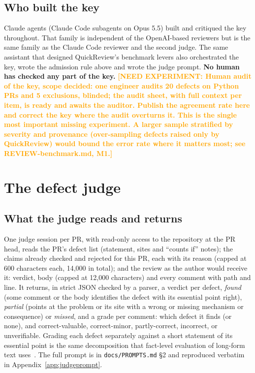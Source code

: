 \documentclass[11pt,a4paper]{article}
\newcommand{\NEEDEXP}[1]{\textcolor{orange}{\textbf{[NEED EXPERIMENT: #1]}}}
\newcommand{\qcr}{QuickReview}
\newcommand{\code}[1]{\texttt{#1}}
\begin{document}
\subsection{Who built the key}

Claude agents (Claude Code subagents on Opus 5.5) built and critiqued the
key throughout. That family is independent of the OpenAI-based reviewers but
is the same family as the Claude Code reviewer and the second judge. The
same assistant that designed \qcr{}'s benchmark levers also orchestrated
the key, wrote the admission rule above and wrote the judge prompt.
\textbf{No human has checked any part of the key.}
\NEEDEXP{Human audit of the key, scope decided: one engineer audits 20 defects
on Python PRs and 5 exclusions, blinded; the audit sheet, with full context
per item, is ready and awaits the auditor. Publish the agreement rate here and
correct the key where the audit overturns it. This is the single most
important missing experiment. A larger sample stratified by severity and
provenance (over-sampling defects raised only by \qcr{}) would bound the
error rate where it matters most; see REVIEW-benchmark.md, M1.}

\section{The defect judge}
\label{sec:judging}

\subsection{What the judge reads and returns}

One judge session per PR, with read-only access to the repository at the PR
head, reads the PR's defect list (statement, sites and ``counts if'' notes);
the claims already checked and rejected for this PR, each with its reason
(capped at 600 characters each, 14{,}000 in total); and the review as the
author would receive it: verdict, body (capped at 12{,}000 characters) and
every comment with path and line. It returns, in strict JSON checked by a
parser, a verdict per defect, \emph{found} (some comment or the body
identifies the defect with its essential point right), \emph{partial}
(points at the problem or its site with a wrong or missing mechanism or
consequence) or \emph{missed}, and a grade per comment: which defect it
finds (or none), and correct-valuable, correct-minor, partly-correct,
incorrect, or unverifiable. Grading each defect separately against a short
statement of its essential point is the same decomposition that
fact-level evaluation of long-form text uses~\cite{min2023factscore}. The
full prompt is in \code{docs/PROMPTS.md} \S2 and reproduced verbatim in
Appendix~\ref{app:judgeprompt}.
\end{document}
